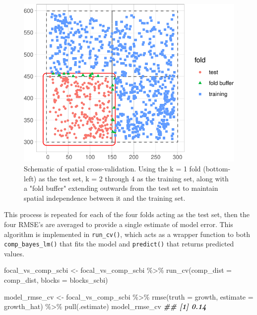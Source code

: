 \documentclass[12pt]{article}
\newenvironment{Shaded}{\begin{snugshade}}{\end{snugshade}}
\newcommand{\AttributeTok}[1]{\textcolor[rgb]{0.77,0.63,0.00}{#1}}
\newcommand{\DocumentationTok}[1]{\textcolor[rgb]{0.56,0.35,0.01}{\textbf{\textit{#1}}}}
\newcommand{\FunctionTok}[1]{\textcolor[rgb]{0.00,0.00,0.00}{#1}}
\newcommand{\NormalTok}[1]{#1}
\newcommand{\OtherTok}[1]{\textcolor[rgb]{0.56,0.35,0.01}{#1}}
\newcommand{\SpecialCharTok}[1]{\textcolor[rgb]{0.00,0.00,0.00}{#1}}
\begin{document}
\begin{figure}

{\centering \includegraphics[width=0.66\linewidth]{Figures/scbi-spatial-cross-validation-schematic-1} 

}

\caption{Schematic of spatial cross-validation. Using the k = 1 fold (bottom-left) as the test set, k = 2 through 4 as the training set, along with a "fold buffer" extending outwards from the test set to maintain spatial independence between it and the training set.}\label{fig:scbi-spatial-cross-validation-schematic}
\end{figure}

This process is repeated for each of the four folds acting as the test
set, then the four RMSE's are averaged to provide a single estimate of
model error. This algorithm is implemented in \texttt{run\_cv()}, which
acts as a wrapper function to both \texttt{comp\_bayes\_lm()} that fits
the model and \texttt{predict()} that returns predicted values.

\begin{Shaded}
\begin{Highlighting}[]
\NormalTok{focal\_vs\_comp\_scbi }\OtherTok{\textless{}{-}}\NormalTok{ focal\_vs\_comp\_scbi }\SpecialCharTok{\%\textgreater{}\%}
    \FunctionTok{run\_cv}\NormalTok{(}\AttributeTok{comp\_dist =}\NormalTok{ comp\_dist, }\AttributeTok{blocks =}\NormalTok{ blocks\_scbi)}
\end{Highlighting}
\end{Shaded}

\begin{Shaded}
\begin{Highlighting}[]
\NormalTok{model\_rmse\_cv }\OtherTok{\textless{}{-}}\NormalTok{ focal\_vs\_comp\_scbi }\SpecialCharTok{\%\textgreater{}\%}
    \FunctionTok{rmse}\NormalTok{(}\AttributeTok{truth =}\NormalTok{ growth, }\AttributeTok{estimate =}\NormalTok{ growth\_hat) }\SpecialCharTok{\%\textgreater{}\%}
    \FunctionTok{pull}\NormalTok{(.estimate)}
\NormalTok{model\_rmse\_cv}
\DocumentationTok{\#\# [1] 0.14}
\end{Highlighting}
\end{Shaded}
\end{document}
